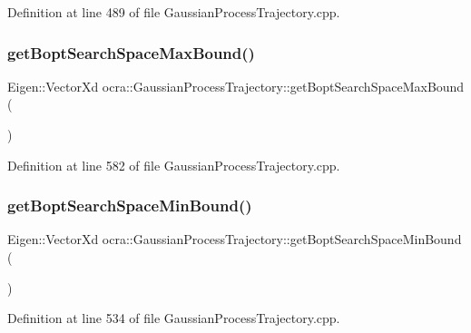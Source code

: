Definition at line 489 of file Gaussian\+Process\+Trajectory.\+cpp.

\hypertarget{classocra_1_1GaussianProcessTrajectory_a82a83fb9fd6351253f5d317747edf12c}{}\label{classocra_1_1GaussianProcessTrajectory_a82a83fb9fd6351253f5d317747edf12c} 
\subsubsection{\texorpdfstring{get\+Bopt\+Search\+Space\+Max\+Bound()}{getBoptSearchSpaceMaxBound()}}
{\footnotesize\ttfamily Eigen\+::\+Vector\+Xd ocra\+::\+Gaussian\+Process\+Trajectory\+::get\+Bopt\+Search\+Space\+Max\+Bound (\begin{DoxyParamCaption}{ }\end{DoxyParamCaption})}



Definition at line 582 of file Gaussian\+Process\+Trajectory.\+cpp.

\hypertarget{classocra_1_1GaussianProcessTrajectory_a4678cb03e8523c8c5d489c91623a6ce4}{}\label{classocra_1_1GaussianProcessTrajectory_a4678cb03e8523c8c5d489c91623a6ce4} 
\subsubsection{\texorpdfstring{get\+Bopt\+Search\+Space\+Min\+Bound()}{getBoptSearchSpaceMinBound()}}
{\footnotesize\ttfamily Eigen\+::\+Vector\+Xd ocra\+::\+Gaussian\+Process\+Trajectory\+::get\+Bopt\+Search\+Space\+Min\+Bound (\begin{DoxyParamCaption}{ }\end{DoxyParamCaption})}



Definition at line 534 of file Gaussian\+Process\+Trajectory.\+cpp.

\hypertarget{classocra_1_1GaussianProcessTrajectory_af2815cd9e07b8470a5850474dd19e708}{}\label{classocra_1_1GaussianProcessTrajectory_af2815cd9e07b8470a5850474dd19e708} 

